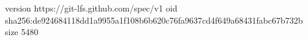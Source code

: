 version https://git-lfs.github.com/spec/v1
oid sha256:de924684118dd1a9955a1f108b6b620c76fa9637cd4f649a68431fabc67b732b
size 5480
